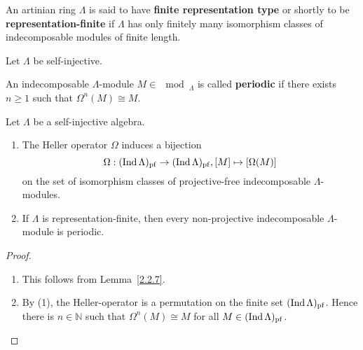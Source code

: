 
\begin{definition}
  An artinian ring $\Lambda$ is said to have \textbf{finite representation type} or shortly to be
  \textbf{representation-finite} if $\Lambda$ has only finitely many isomorphism classes
  of indecomposable modules of finite length.
\end{definition}


Let $\Lambda$ be self-injective.


\begin{definition}
  An indecomposable $\Lambda$-module $M \in \mod_\Lambda$ is called \textbf{periodic} if there
  exists $n \ge 1$ such that $\Omega^n(M) \cong  M$.
\end{definition}
\begin{proposition}\label{2.2.8}
  Let $\Lambda$ be a self-injective algebra.
  \begin{enumerate}
  \item The Heller operator $\Omega$ induces a bijection
    \[ \Omega: (\operatorname{Ind} \Lambda)_{\mathrm{pf}} \to (\operatorname{Ind} \Lambda)_{\mathrm{pf}}, [M] \mapsto [\Omega(M)] \]
    on the set of isomorphism classes of projective-free indecomposable $\Lambda$-modules.
  \item If $\Lambda$ is representation-finite, then every non-projective indecomposable
    $\Lambda$-module is periodic.
  \end{enumerate}
\end{proposition}
\begin{proof}\
  \begin{enumerate}
  \item This follows from Lemma~\ref{2.2.7}.
\item By (1), the Heller-operator is a permutation on the finite set $(\operatorname{Ind}
  \Lambda)_{\mathrm{pf}}$. Hence there is $n \in \mathbb N$ such that $\Omega^n(M) \cong  M $ for all $M \in (\operatorname{Ind} \Lambda)_{\mathrm{pf}}$.\qedhere
\end{enumerate}
\end{proof}

